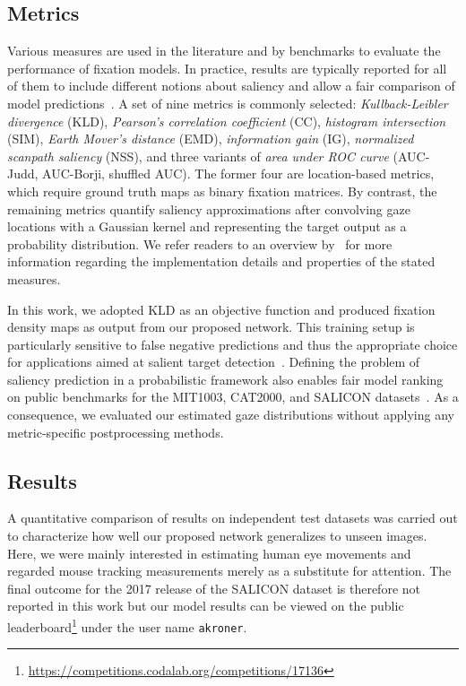 \documentclass[final,1p,times,number]{elsarticle}
\begin{document}
\subsection{Metrics}

Various measures are used in the literature and by benchmarks to evaluate the performance of fixation models. In practice, results are typically reported for all of them to include different notions about saliency and allow a fair comparison of model predictions~\cite{kummerer2018saliency,riche2013saliency}. A set of nine metrics is commonly selected: \textit{Kullback-Leibler divergence} (KLD), \textit{Pearson's correlation coefficient} (CC), \textit{histogram intersection} (SIM), \textit{Earth Mover's distance} (EMD), \textit{information gain} (IG), \textit{normalized scanpath saliency} (NSS), and three variants of \textit{area under ROC curve} (AUC-Judd, AUC-Borji, shuffled AUC). The former four are location-based metrics, which require ground truth maps as binary fixation matrices. By contrast, the remaining metrics quantify saliency approximations after convolving gaze locations with a Gaussian kernel and representing the target output as a probability distribution. We refer readers to an overview by~\citet{bylinskii2018different} for more information regarding the implementation details and properties of the stated measures.

In this work, we adopted KLD as an objective function and produced fixation density maps as output from our proposed network. This training setup is particularly sensitive to false negative predictions and thus the appropriate choice for applications aimed at salient target detection~\cite{bylinskii2018different}. Defining the problem of saliency prediction in a probabilistic framework also enables fair model ranking on public benchmarks for the MIT1003, CAT2000, and SALICON datasets~\cite{kummerer2018saliency}. As a consequence, we evaluated our estimated gaze distributions without applying any metric-specific postprocessing methods.

\subsection{Results}

A quantitative comparison of results on independent test datasets was carried out to characterize how well our proposed network generalizes to unseen images. Here, we were mainly interested in estimating human eye movements and regarded mouse tracking measurements merely as a substitute for attention. The final outcome for the 2017 release of the SALICON dataset is therefore not reported in this work but our model results can be viewed on the public leaderboard\footnote{\url{https://competitions.codalab.org/competitions/17136}} under the user name \texttt{akroner}.
\end{document}
